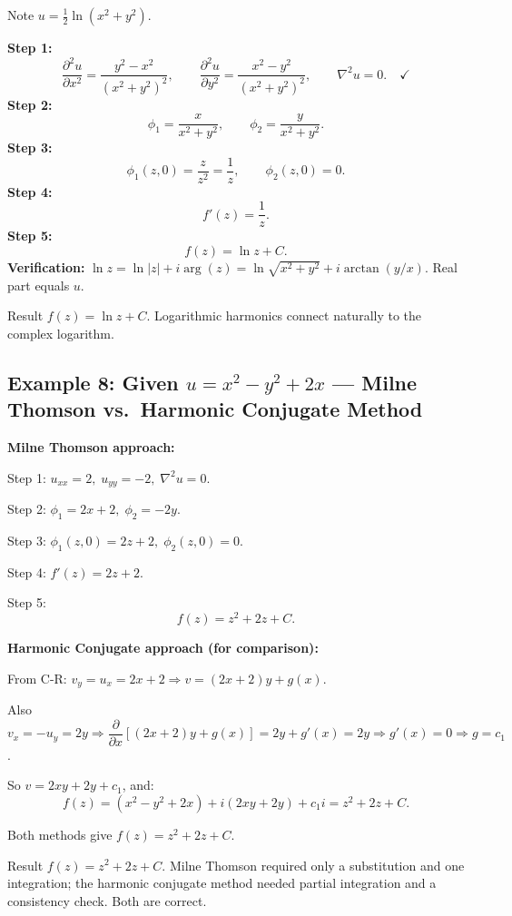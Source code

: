 \documentclass[12pt,a4paper]{article}
\begin{document}
Note \( u = \tfrac{1}{2}\ln(x^2+y^2) \).

\textbf{Step 1:}
\[
\frac{\partial^2 u}{\partial x^2} = \frac{y^2-x^2}{(x^2+y^2)^2}, \qquad \frac{\partial^2 u}{\partial y^2} = \frac{x^2-y^2}{(x^2+y^2)^2}, \qquad \nabla^2 u = 0. \quad \checkmark
\]
\textbf{Step 2:}
\[
\phi_1 = \frac{x}{x^2+y^2}, \qquad \phi_2 = \frac{y}{x^2+y^2}.
\]
\textbf{Step 3:}
\[
\phi_1(z,0) = \frac{z}{z^2} = \frac{1}{z}, \qquad \phi_2(z,0) = 0.
\]
\textbf{Step 4:}
\[
f'(z) = \frac{1}{z}.
\]
\textbf{Step 5:}
\[
f(z) = \ln z + C.
\]
\textbf{Verification:} \( \ln z = \ln|z| + i\arg(z) = \ln\sqrt{x^2+y^2} + i\arctan(y/x) \). Real part equals \( u \). \checkmark

\begin{learnbox}{Result}
\( f(z) = \ln z + C \). Logarithmic harmonics connect naturally to the complex logarithm.
\end{learnbox}

\subsection*{Example 8: Given \( u = x^2 - y^2 + 2x \) --- Milne Thomson vs.\ Harmonic Conjugate Method}

\textbf{Milne Thomson approach:}

Step 1: \( u_{xx} = 2,\; u_{yy} = -2,\; \nabla^2 u = 0 \). \checkmark

Step 2: \( \phi_1 = 2x+2,\; \phi_2 = -2y \).

Step 3: \( \phi_1(z,0) = 2z+2,\; \phi_2(z,0) = 0 \).

Step 4: \( f'(z) = 2z + 2 \).

Step 5:
\[
f(z) = z^2 + 2z + C.
\]

\vspace{6pt}
\textbf{Harmonic Conjugate approach (for comparison):}

From C-R: \( v_y = u_x = 2x+2 \Rightarrow v = (2x+2)y + g(x) \).

Also \( v_x = -u_y = 2y \Rightarrow \dfrac{\partial}{\partial x}[(2x+2)y + g(x)] = 2y + g'(x) = 2y \Rightarrow g'(x) = 0 \Rightarrow g = c_1 \).

So \( v = 2xy + 2y + c_1 \), and:
\[
f(z) = (x^2-y^2+2x) + i(2xy+2y) + c_1 i = z^2 + 2z + C.
\]

Both methods give \( f(z) = z^2 + 2z + C \). \checkmark

\begin{learnbox}{Result}
\( f(z) = z^2 + 2z + C \). Milne Thomson required only a substitution and one integration; the harmonic conjugate method needed partial integration and a consistency check. Both are correct.
\end{learnbox}
\end{document}

